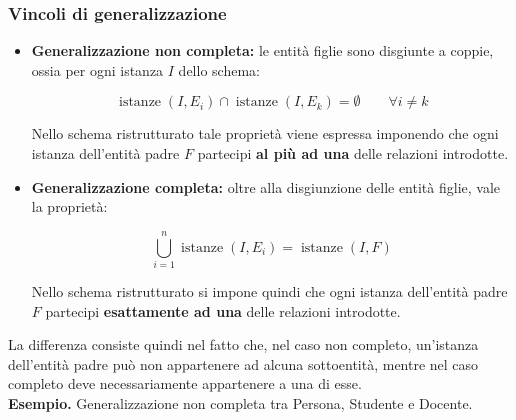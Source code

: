 \subsubsection*{Vincoli di generalizzazione}
\begin{itemize}
    \item \textbf{Generalizzazione non completa:}
    le entità figlie sono disgiunte a coppie,
    ossia per ogni istanza $I$ dello schema:

    \[
    \operatorname{istanze}(I,E_i)
    \cap
    \operatorname{istanze}(I,E_k)
    =\emptyset
    \qquad \forall i\neq k
    \]

    Nello schema ristrutturato tale proprietà
    viene espressa imponendo che ogni istanza
    dell'entità padre $F$ partecipi
    \textbf{al più ad una} delle relazioni
    introdotte.

    \item \textbf{Generalizzazione completa:}
    oltre alla disgiunzione delle entità figlie,
    vale la proprietà:

    \[
    \bigcup_{i=1}^{n}
    \operatorname{istanze}(I,E_i)
    =
    \operatorname{istanze}(I,F)
    \]

    Nello schema ristrutturato si impone quindi
    che ogni istanza dell'entità padre $F$
    partecipi \textbf{esattamente ad una}
    delle relazioni introdotte.
\end{itemize}
\noindent
La differenza consiste quindi nel fatto che,
nel caso non completo, un'istanza dell'entità
padre può non appartenere ad alcuna sottoentità,
mentre nel caso completo deve necessariamente
appartenere a una di esse.\medskip\\
\noindent
\textcolor{verdeEsempio}{\textbf{Esempio. }}
Generalizzazione non completa tra Persona,
Studente e Docente.

